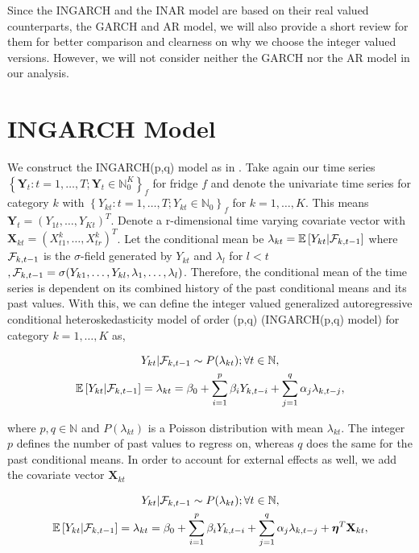 Since the INGARCH and the INAR model are based on their real valued counterparts, the GARCH and AR model, we will also provide a short review for them for better comparison and clearness on why we choose the integer valued versions. However, we will not consider neither the GARCH nor the AR model in our analysis. 

\section{INGARCH Model}
\label{sec:Ingarch}

We construct the INGARCH(p,q) model as in \cite{Liboschik:2016}. 
Take again our time series $\left\{\bm{Y}_t:t=1,\ldots,T; \bm{Y}_t \in \mathbb{N}_0^K \right\}_f$ for fridge $f$ and denote the univariate time series for category $k$ with $\left\{Y_{kt}:t=1,\ldots,T; Y_{kt} \in \mathbb{N}_0\right\}_f$  for $k=1,\ldots,K$. This means $\bm{Y}_t = (Y_{1t},\ldots,Y_{Kt})^T$. Denote a r-dimensional time varying covariate vector with $\textbf{X}_{kt}=(X_{t1}^k,\ldots,X_{tr}^k)^T$. Let the conditional mean be $\lambda_{kt} = \mathbb{E}\left[Y_{kt} | \mathcal{F}_{k,t-1} \right]$ where $\mathcal{F}_{k,t-1}$ is the $\sigma$-field generated by $Y_{kt}$ and $\lambda_l$ for $l<t$ $, \mathcal{F} _{k,t-1}= \sigma(Y_{k1},\ldots,Y_{kl},\lambda_1, \ldots, \lambda_l)$. Therefore, the conditional mean of the time series is dependent on its combined history of the past conditional means and its past values. With this, we can define the integer valued generalized autoregressive conditional heteroskedasticity model of order (p,q) (INGARCH(p,q) model) for category $k=1,\ldots,K$ as,

\begin{gather}
\label{eq:Ingarch model}
Y_{kt} | \mathcal{F}_{k,t-1} \sim P(\lambda_{kt}); \forall t \in \mathbb{N}, \\
\mathbb{E}\left[Y_{kt} | \mathcal{F}_{k,t-1} \right] = \lambda_{kt} = \beta_0 + \sum_{i=1}^p\beta_i Y_{k,t-i} + \sum_{j=1}^q\alpha_j \lambda_{k,t-j},
\end{gather}

where $p,q \in \mathbb{N}$ and $P(\lambda_{kt})$ is a Poisson distribution with mean $\lambda_{kt}$. The integer $p$ defines the number of past values to regress on, whereas $q$ does the same for the past conditional means. In order to account for external effects as well, we add the covariate vector $\textbf{X}_{kt}$

\begin{gather}
\label{eq:Ingarch model with external effect}
Y_{kt} | \mathcal{F}_{k,t-1} \sim P(\lambda_{kt}); \forall t \in \mathbb{N}, \\
\mathbb{E}\left[Y_{kt} | \mathcal{F}_{k,t-1} \right] = \lambda_{kt} = \beta_0 + \sum_{i=1}^p\beta_i Y_{k,t-i} + \sum_{j=1}^q\alpha_j \lambda_{k,t-j} + \bm{\eta}^T\textbf{X}_{kt},
\end{gather}

